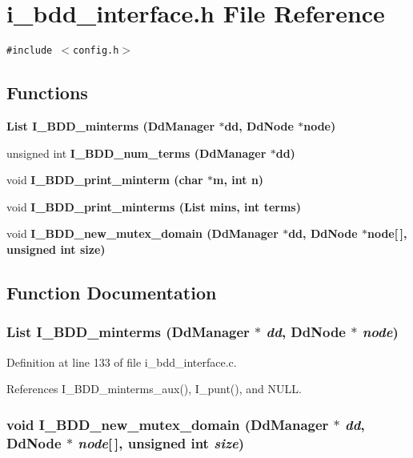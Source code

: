\section{i\_\-bdd\_\-interface.h File Reference}
\label{i__bdd__interface_8h}
{\tt \#include $<$config.h$>$}\par
\subsection*{Functions}
\begin{CompactItemize}
\item 
\bf{List} \bf{I\_\-BDD\_\-minterms} (Dd\-Manager $\ast$dd, Dd\-Node $\ast$\bf{node})
\item 
unsigned int \bf{I\_\-BDD\_\-num\_\-terms} (Dd\-Manager $\ast$dd)
\item 
void \bf{I\_\-BDD\_\-print\_\-minterm} (char $\ast$m, int n)
\item 
void \bf{I\_\-BDD\_\-print\_\-minterms} (\bf{List} mins, int terms)
\item 
void \bf{I\_\-BDD\_\-new\_\-mutex\_\-domain} (Dd\-Manager $\ast$dd, Dd\-Node $\ast$\bf{node}[$\,$], unsigned int size)
\end{CompactItemize}


\subsection{Function Documentation}
\subsubsection{\setlength{\rightskip}{0pt plus 5cm}\bf{List} I\_\-BDD\_\-minterms (Dd\-Manager $\ast$ {\em dd}, Dd\-Node $\ast$ {\em node})}\label{i__bdd__interface_8h_460c13ed2babc80e0c9ad1deebc56b4f}




Definition at line 133 of file i\_\-bdd\_\-interface.c.

References I\_\-BDD\_\-minterms\_\-aux(), I\_\-punt(), and NULL.
\subsubsection{\setlength{\rightskip}{0pt plus 5cm}void I\_\-BDD\_\-new\_\-mutex\_\-domain (Dd\-Manager $\ast$ {\em dd}, Dd\-Node $\ast$ {\em node}[$\,$], unsigned int {\em size})}\label{i__bdd__interface_8h_e3594fdd398fe3a15f8ddaf7eb1256a7}




